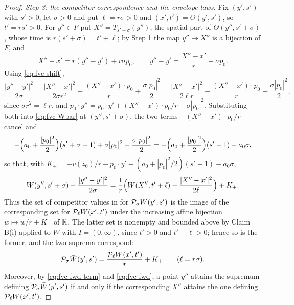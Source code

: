 \begin{proof}
\emph{Step 3: the competitor correspondence and the envelope laws.}
Fix $(y',s')$ with $s'>0$, let $\sigma>0$ and put $\ell=r\sigma>0$ and
$(x',t')=\Theta(y',s')$, so $t'=rs'>0$. For $y''\in F$ put
$X''=T_{s'+\sigma}(y'')$, the spatial part of $\Theta(y'',s'+\sigma)$, whose
time is $r(s'+\sigma)=t'+\ell$; by Step 1 the map $y''\mapsto X''$ is a
bijection of $F$, and
\begin{equation}\label{eq:fvc-shift}
  X''-x'=r(y''-y')+r\sigma p_0,\qquad
  y''-y'=\frac{X''-x'}{r}-\sigma p_0 .
\end{equation}
Using \eqref{eq:fvc-shift},
\[
  \frac{|y''-y'|^2}{2\sigma}
   =\frac{|X''-x'|^2}{2\sigma r^2}-\frac{(X''-x')\cdot p_0}{r}
      +\frac{\sigma|p_0|^2}{2}
   =\frac{|X''-x'|^2}{2\ell r}-\frac{(X''-x')\cdot p_0}{r}
      +\frac{\sigma|p_0|^2}{2},
\]
since $\sigma r^2=\ell r$, and
$p_0\cdot y''=p_0\cdot y'+(X''-x')\cdot p_0/r-\sigma|p_0|^2$. Substituting both
into \eqref{eq:fvc-Wbar} at $(y'',s'+\sigma)$, the two terms
$\pm(X''-x')\cdot p_0/r$ cancel and
\[
  -\Bigl(a_0+\frac{|p_0|^2}{2}\Bigr)(s'+\sigma-1)+\sigma|p_0|^2
     -\frac{\sigma|p_0|^2}{2}
  =-\Bigl(a_0+\frac{|p_0|^2}{2}\Bigr)(s'-1)-a_0\sigma,
\]
so that, with
$K_+=-v(z_0)/r-p_0\cdot y'-(a_0+|p_0|^2/2)(s'-1)-a_0\sigma$,
\begin{equation}\label{eq:fvc-fwd-term}
  \bar W(y'',s'+\sigma)-\frac{|y''-y'|^2}{2\sigma}
   =\frac1r\Bigl(W(X'',t'+\ell)-\frac{|X''-x'|^2}{2\ell}\Bigr)+K_+ .
\end{equation}
Thus the set of competitor values in  for
$\mathcal{P}_\sigma\bar W(y',s')$ is the image of the corresponding set for
$\mathcal{P}_\ell W(x',t')$ under the increasing affine bijection
$w\mapsto w/r+K_+$ of $\mathbb{R}$. The latter set is nonempty and bounded above by
Claim B(i) applied to $W$ with $I=(0,\infty)$, since $t'>0$ and
$t'+\ell>0$; hence so is the former, and the two suprema correspond:
\begin{equation}\label{eq:fvc-fwd}
  \mathcal{P}_\sigma\bar W(y',s')
   =\frac{\mathcal{P}_\ell W(x',t')}{r}+K_+\qquad(\ell=r\sigma).
\end{equation}
Moreover, by \eqref{eq:fvc-fwd-term} and \eqref{eq:fvc-fwd}, a point $y''$
attains the supremum defining $\mathcal{P}_\sigma\bar W(y',s')$ if and only if the
corresponding $X''$ attains the one defining $\mathcal{P}_\ell W(x',t')$.


\end{proof}
